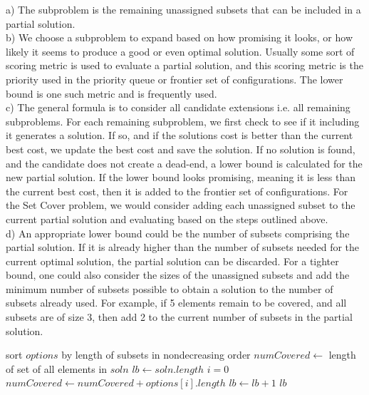 \documentclass{article}
\begin{document}
a) The subproblem is the remaining unassigned subsets that can be included in a partial solution.\\

b) We choose a subproblem to expand based on how promising it looks, or how likely it seems to produce a good or even optimal solution. Usually some sort of scoring metric is used to evaluate a partial solution, and this scoring metric is the priority used in the priority queue or frontier set of configurations. The lower bound is one such metric and is frequently used.\\

c) The general formula is to consider all candidate extensions i.e. all remaining subproblems. For each remaining subproblem, we first check to see if it including it generates a solution. If so, and if the solutions cost is better than the current best cost, we update the best cost and save the solution. If no solution is found, and the candidate does not create a dead-end, a lower bound is calculated for the new partial solution. If the lower bound looks promising, meaning it is less than the current best cost, then it is added to the frontier set of configurations. For the Set Cover problem, we would consider adding each unassigned subset to the current partial solution and evaluating based on the steps outlined above. \\

d) An appropriate lower bound could be the number of subsets comprising the partial solution. If it is already higher than the number of subsets needed for the current optimal solution, the partial solution can be discarded. For a tighter bound, one could also consider the sizes of the unassigned subsets and add the minimum number of subsets possible to obtain a solution to the number of subsets already used. For example, if 5 elements remain to be covered, and all subsets are of size 3, then add 2 to the current number of subsets in the partial solution.\\

\begin{algorithm}
\begin{algorithmic}[1]
	\State sort $options$ by length of subsets in nondecreasing order
	\State $numCovered \gets $ length of set of all elements in $soln$
	\State $lb \gets soln.length$
	\State $i = 0$
		\State $numCovered \gets numCovered + options[i].length$
		\State $lb \gets lb + 1$
	\EndWhile
	\State \Return $lb$
\EndFunction
\end{algorithmic}
\end{algorithm}
\end{document}
